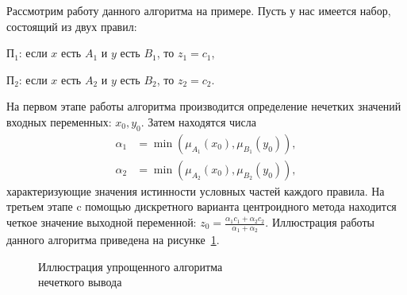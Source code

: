 Рассмотрим работу данного алгоритма на примере.
Пусть у нас имеется набор, состоящий из двух правил: \par
\( \text{П}_1 \): если \( x \) есть \( A_1 \) и \( y \) есть \( B_1 \), то \( z_1 = c_1 \), \par
\( \text{П}_2 \): если \( x \) есть \( A_2 \) и \( y \) есть \( B_2 \), то \( z_2 = c_2 \).

На первом этапе работы алгоритма производится определение нечетких значений входных переменных:
\( x_0, y_0 \). Затем находятся числа
\[
  \begin{aligned}
    \alpha_1 &= \min(\mu_{A_1}(x_0), \mu_{B_1}(y_0)), \\
    \alpha_2 &= \min(\mu_{A_2}(x_0), \mu_{B_2}(y_0)),
  \end{aligned}
\]
характеризующие значения истинности условных частей каждого правила.
На третьем этапе c помощью дискретного варианта центроидного метода
находится четкое значение выходной переменной:
\( z_0 = \frac{\alpha_1 c_1 + \alpha_2 c_2}{\alpha_1 + \alpha_2} \).
Иллюстрация работы данного алгоритма приведена на рисунке~\ref{fig:algo_simple}.

\begin{figure}[h!]
  \centering
  \caption{Иллюстрация упрощенного алгоритма \\ нечеткого вывода}
  \label{fig:algo_simple}
\end{figure}